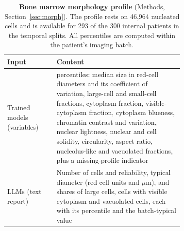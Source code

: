 \documentclass[pdflatex,sn-nature]{sn-jnl}
\begin{document}
\begin{appendices}
\begin{table}[ht]
\caption{\textbf{Bone marrow morphology profile} (Methods,
Section~\ref{sec:morph}). The profile rests on 46,964 nucleated cells
and is available for 293 of the 300 internal patients in the temporal
splits. All percentiles are computed within the patient's imaging
batch.}
\label{tab:morph_features}
\centering
\footnotesize
\setlength{\tabcolsep}{4pt}
\begin{tabular}{@{}l >{\raggedright\arraybackslash}p{0.72\linewidth}@{}}
\toprule
\textbf{Input} & \textbf{Content} \\
\midrule
Trained models (variables) & 16 percentiles: median size in red-cell diameters and its coefficient of variation, large-cell and small-cell fractions, cytoplasm fraction, visible-cytoplasm fraction, cytoplasm blueness, chromatin contrast and variation, nuclear lightness, nuclear and cell solidity, circularity, aspect ratio, nucleolus-like and vacuolated fractions, plus a missing-profile indicator \\
\addlinespace[3pt]
LLMs (text report) & Number of cells and reliability, typical diameter (red-cell units and $\mu$m), and shares of large cells, cells with visible cytoplasm and vacuolated cells, each with its percentile and the batch-typical value \\
\bottomrule
\end{tabular}
\end{table}

\clearpage


\end{appendices}
\end{document}
